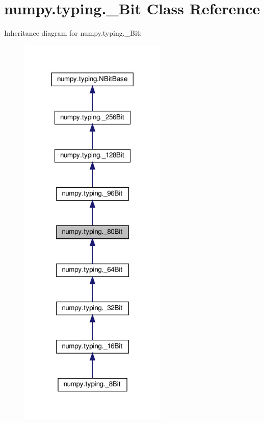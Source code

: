 \hypertarget{classnumpy_1_1typing_1_1__80Bit}{}\section{numpy.\+typing.\+\_\+Bit Class Reference}
\label{classnumpy_1_1typing_1_1__80Bit}


Inheritance diagram for numpy.\+typing.\+\_\+Bit\+:
\nopagebreak
\begin{figure}[H]
\begin{center}
\leavevmode
\includegraphics[width=200pt]{classnumpy_1_1typing_1_1__80Bit__inherit__graph}
\end{center}
\end{figure}


